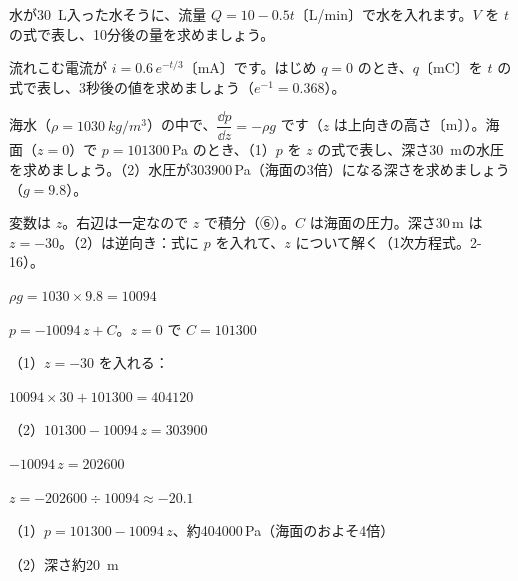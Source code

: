\begingroup{}%
\noindent\begin{minipage}[t]{0.49\linewidth}
\begin{jibun}
\raggedright 水が\qty{30}{L}入った水そうに、流量 $Q=10-0.5t$〔L/min〕で水を入れます。$V$ を $t$ の式で表し、10分後の量を求めましょう。
\end{jibun}
\end{minipage}\hfill
\begin{minipage}[t]{0.49\linewidth}
\begin{jibun}
\raggedright 流れこむ電流が $i=0.6\,e^{-t/3}$〔mA〕です。はじめ $q=0$ のとき、$q$〔mC〕を $t$ の式で表し、3秒後の値を求めましょう（$e^{-1}=0.368$）。
\end{jibun}
\end{minipage}\par
\endgroup

\begin{reidai}[深さと水圧]
海水（$\rho=\qty{1030}{kg/m^3}$）の中で、$\dfrac{\dd p}{\dd z}=-\rho g$ です（$z$ は上向きの高さ〔m〕）。海面（$z=0$）で $p=\num{101300}$\,Pa のとき、（1）$p$ を $z$ の式で表し、深さ\qty{30}{m}の水圧を求めましょう。（2）水圧が\num{303900}\,Pa（海面の3倍）になる深さを求めましょう（$g=9.8$）。\par
\kangaekata 変数は $z$。右辺は一定なので $z$ で積分（⑥）。$C$ は海面の圧力。深さ30\,m は $z=-30$。（2）は逆向き：式に $p$ を入れて、$z$ について解く（1次方程式。2-16）。\par
\shiki $\rho g=1030\times9.8=\num{10094}$\par
\bkvidl $p=-\num{10094}\,z+C$。$z=0$ で $C=\num{101300}$\par
\bkvidl （1）$z=-30$ を入れる：\par
\bkvidl \phantom{（1）}$\num{10094}\times30+\num{101300}=\num{404120}$\par
\bkvidl （2）$\num{101300}-\num{10094}\,z=\num{303900}$\par
\bkvidl \phantom{（2）}$-\num{10094}\,z=\num{202600}$\par
\bkvidl \phantom{（2）}$z=-\num{202600}\div\num{10094}\approx-20.1$\par
\kotae （1）$p=\num{101300}-\num{10094}\,z$、約\num{404000}\,Pa（海面のおよそ4倍）\par
\bkvidl（2）深さ約\qty{20}{m}
\end{reidai}

